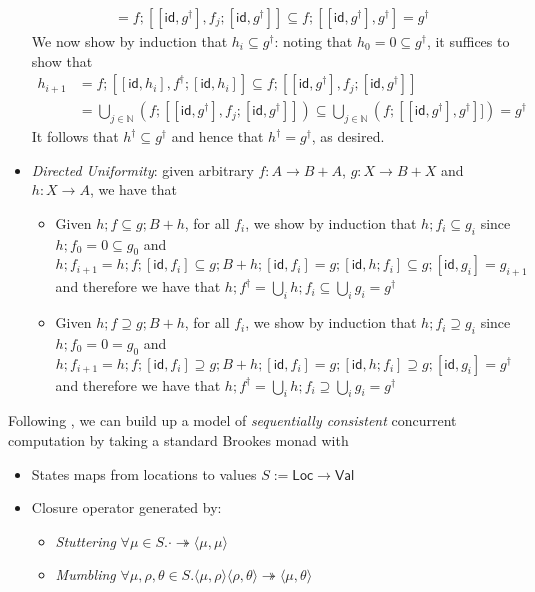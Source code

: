 \documentclass[acmsmall,screen,review]{acmart}
\newcommand{\ms}[1]{\ensuremath{\mathsf{#1}}}
\newcommand{\nats}{\mathbb{N}}
\newcommand{\tref}{\twoheadrightarrow}
\begin{document}
\begin{itemize}
\begin{align*}
    = f ; [[\ms{id}, g^\dagger], f_j ; [\ms{id}, g^\dagger]]
    \subseteq f ;  [[\ms{id}, g^\dagger], g^\dagger] = g^\dagger
  \end{align*}
  We now show by induction that $h_i \subseteq g^\dagger$: noting that $h_0 = 0
  \subseteq g^\dagger$, it suffices to show that
  \begin{align*}
  h_{i + 1} 
  & = f ; [[\ms{id}, h_i], f^\dagger ; [\ms{id}, h_i]] 
    \subseteq f ; [[\ms{id}, g^\dagger], f_j ; [\ms{id}, g^\dagger]] \\
  & = \bigcup_{j \in \nats}(f ; [[\ms{id}, g^\dagger], f_j ; [\ms{id}, g^\dagger]])
    \subseteq \bigcup_{j \in \nats}(f ; [[\ms{id}, g^\dagger], g^\dagger]])
    = g^\dagger
  \end{align*}
  It follows that $h^\dagger \subseteq g^\dagger$ and hence that $h^\dagger = g^\dagger$, as
  desired.
  \item \emph{Directed Uniformity}: given arbitrary $f : A \to B + A$, $g : X \to B + X$ and $h : X
  \to A$, we have that
  \begin{itemize}
    \item Given $h ; f \subseteq g ; B + h$, for all $f_i$, we show by induction that 
    $h ; f_i \subseteq g_i$ since $h ; f_0 = 0 \subseteq g_0$ and
    \begin{equation*}
    h ; f_{i + 1} = h ; f ; [\ms{id}, f_i] 
    \subseteq g ; B + h ; [\ms{id}, f_i]
    = g ; [\ms{id}, h ; f_i] \subseteq g ; [\ms{id}, g_i] = g_{i + 1}
    \end{equation*}
    and therefore we have that $h ; f^\dagger = \bigcup_i h ; f_i \subseteq \bigcup_i g_i =
    g^\dagger$
    \item Given $h ; f \supseteq g ; B + h$, for all $f_i$, we show by induction that 
    $h ; f_i \supseteq g_i$ since $h ; f_0 = 0 = g_0$ and
    \begin{equation*}
    h ; f_{i + 1} = h ; f ; [\ms{id}, f_i] 
    \supseteq g ; B + h ; [\ms{id}, f_i]
    = g ; [\ms{id}, h ; f_i] \supseteq g ; [\ms{id}, g_i] = g^\dagger
    \end{equation*}
    and therefore we have that $h ; f^\dagger = \bigcup_i h ; f_i \supseteq \bigcup_i g_i =
    g^\dagger$
  \end{itemize}
\end{itemize}
Following \citet{brookes-full-abstraction-96}, we can build up a model of \emph{sequentially
consistent} concurrent computation by taking a standard Brookes monad with
\begin{itemize}
  \item States maps from locations to values $S := \ms{Loc} \to \ms{Val}$
  \item Closure operator generated by:
  \begin{itemize}
    \item \emph{Stuttering} $\forall \mu \in S . \cdot \tref \langle \mu, \mu \rangle$
    \item \emph{Mumbling} $\forall \mu, \rho, \theta \in S . 
      \langle \mu, \rho \rangle \langle \rho, \theta \rangle \tref \langle \mu, \theta \rangle$
  \end{itemize}
\end{itemize} 
\end{document}
